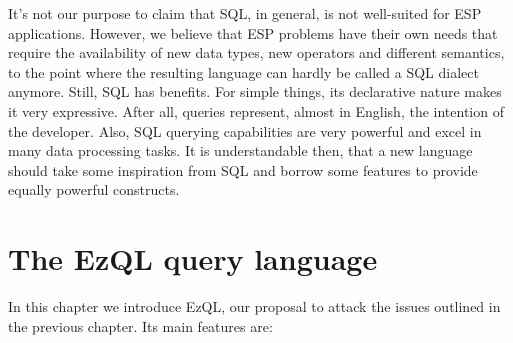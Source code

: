 \documentclass{report}
\begin{document}
It's not our purpose to claim that SQL, in general, is not well-suited
for ESP applications. However, we believe that ESP problems have their
own needs that require the availability of new data types, new
operators and different semantics, to the point where the resulting
language can hardly be called a SQL dialect anymore. Still, SQL has
benefits. For simple things, its declarative nature makes it very
expressive. After all, queries represent, almost in English, the
intention of the developer. Also, SQL querying capabilities are very
powerful and excel in many data processing tasks. It is understandable
then, that a new language should take some inspiration from SQL and
borrow some features to provide equally powerful constructs.

\chapter{The EzQL query language}
\label{chap:ezql}

\lstset{
  language=EzQL,
  columns=fullflexible,
  basicstyle=\tt,
  keywordstyle=[1]\bf,
  keywordstyle=[2]\it,
}

In this chapter we introduce EzQL, our proposal to attack the issues
outlined in the previous chapter. Its main features are:
\end{document}
